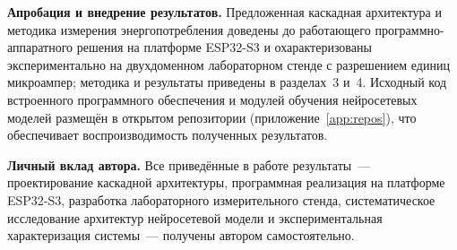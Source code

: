 \textbf{Апробация и внедрение результатов.} Предложенная
каскадная архитектура и методика измерения энергопотребления
доведены до работающего программно-аппаратного решения на
платформе ESP32-S3 и охарактеризованы экспериментально на
двухдоменном лабораторном стенде с разрешением единиц
микроампер; методика и результаты приведены в разделах~3 и~4.
Исходный код встроенного программного обеспечения и модулей
обучения нейросетевых моделей размещён в открытом репозитории
(приложение~\ref{app:repos}), что обеспечивает воспроизводимость полученных
результатов.

\textbf{Личный вклад автора.} Все приведённые в работе
результаты~--- проектирование каскадной архитектуры,
программная реализация на платформе ESP32-S3, разработка
лабораторного измерительного стенда, систематическое
исследование архитектур нейросетевой модели и экспериментальная
характеризация системы~--- получены автором самостоятельно.
